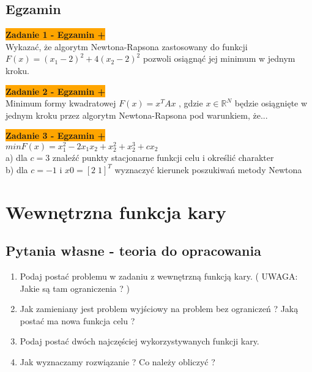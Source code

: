 \documentclass[a4paper,11pt]{article}
\begin{document}
\subsection{Egzamin}

\begin{framed}
\textbf{\colorbox{orange}{Zadanie 1 - Egzamin +}} \\
Wykazać, że algorytm Newtona-Rapsona zastosowany do funkcji \\ \( F(x) = (x_1-2)^2 +4(x_2-2)^2 \) pozwoli osiągnąć jej minimum w jednym kroku.
\end{framed}

\begin{framed}
\textbf{\colorbox{orange}{Zadanie 2 - Egzamin +}} \\
Minimum formy kwadratowej \( F(x) = x^TAx \) , gdzie \( x \in \mathbb{R}^N \) będzie osiągnięte w jednym kroku przez algorytm Newtona-Rapsona pod warunkiem, że...
\end{framed}

\begin{framed}
\textbf{\colorbox{orange}{Zadanie 3 - Egzamin +}} \\
\( min F(x) = x_1^2-2x_1x_2+x_2^2+x_2^3+cx_2 \) \\
a)  dla \( c = 3 \) znaleźć punkty stacjonarne funkcji celu i określić charakter \\
b) dla \( c = -1 \) i \( x0 = [2 \; 1]^T \) wyznaczyć kierunek poszukiwań metody Newtona 
\end{framed}














\newpage
\section{Wewnętrzna funkcja kary}

\subsection{Pytania własne - teoria do opracowania}
\begin{enumerate}
\item Podaj postać problemu w zadaniu z wewnętrzną funkcją kary. ( UWAGA: Jakie są tam ograniczenia ? )
\item Jak zamieniany jest problem wyjściowy na problem bez ograniczeń ? Jaką postać ma nowa funkcja celu ?
\item Podaj postać dwóch najczęściej wykorzystywanych funkcji kary.
\item Jak wyznaczamy rozwiązanie ? Co należy obliczyć ?
\end{enumerate}
\end{document}

